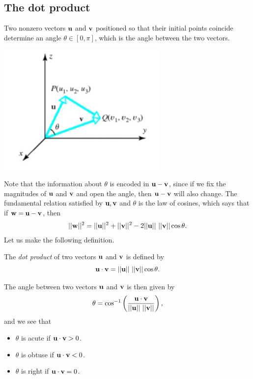 \documentclass[12pt,letterpaper,reqno]{article}
\numberwithin{equation}{section}
\newcommand{\ti}[1]{\textit{#1}}
\begin{document}
\subsection{The dot product}
Two nonzero vectors ${\bf u}$ and ${\bf v}$ positioned so that their initial points coincide determine an angle $\theta \in [0,\pi]$, which is the angle between the two vectors.
\begin{center}
	\includegraphics[scale=0.5]{figures_mvc/angle_uv}
\end{center}
Note that the information about $\theta$ is encoded in ${\bf u}-{\bf v}$, since if we fix the magnitudes of ${\bf u}$ and ${\bf v}$ and open the angle, then ${\bf u}-{\bf v}$ will also change. The fundamental relation satisfied by ${\bf u}, {\bf v}$ and $\theta$ is the law of cosines, which says that if ${\bf w}={\bf u}-{\bf v}$, then
\begin{equation}\label{eq:law_of_cosines}
	||{\bf w}||^2=||{\bf u}||^2+||{\bf v}||^2-2||{\bf u}|| \ ||{\bf v}||\cos \theta. 
\end{equation}
Let us make the following definition.
\begin{defn}
	The \ti{dot product} of two vectors ${\bf u}$ and ${\bf v}$ is defined by
	\begin{equation}\label{eq:dot_product_def}
		{\bf u}\cdot {\bf v}=||{\bf u}|| \ ||{\bf v}||\cos\theta.
	\end{equation} 
\end{defn}
The angle between two vectors ${\bf u}$ and ${\bf v}$ is then given by
\begin{equation}\label{eq:angle_uv}
	\theta=\cos^{-1}\left(\frac{{\bf u}\cdot {\bf v}}{||{\bf u}|| \ ||{\bf v}||}\right),
\end{equation}	
and we see that
\begin{itemize}
	\item $\theta$ is acute if ${\bf u} \cdot {\bf v} > 0$.
	\item $\theta$ is obtuse if ${\bf u} \cdot {\bf v} < 0$.
	\item $\theta$ is right if ${\bf u} \cdot {\bf v} = 0$.
\end{itemize}
\end{document}
